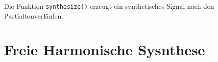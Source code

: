\subsection{}
Die Funktion \texttt{synthesize()} erzeugt ein synthetisches Signal nach den Partialtonverläufen.


\subsection{}


\section{Freie Harmonische Sysnthese}
\label{sec:3}


\subsection{}


\subsection{}


